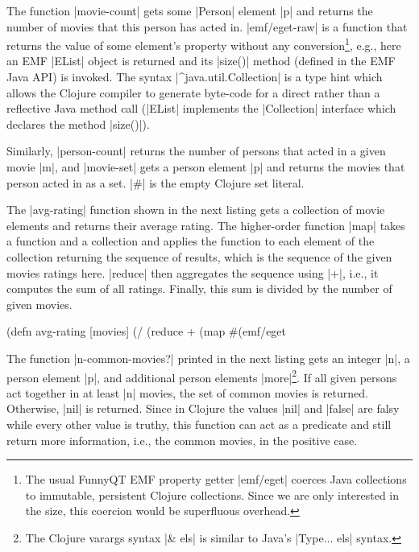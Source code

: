 \documentclass[submission]{eptcs}
\newcommand{\code}{\clojureinline}
\begin{document}
The function \code|movie-count| gets some \code|Person| element \code|p| and
returns the number of movies that this person has acted in.
\code|emf/eget-raw| is a function that returns the value of some element's
property without any conversion\footnote{The usual FunnyQT EMF property getter
  \code|emf/eget| coerces Java collections to immutable, persistent Clojure
  collections.  Since we are only interested in the size, this coercion would
  be superfluous overhead.}, e.g., here an EMF \code|EList| object is returned
and its \code|size()| method (defined in the EMF Java API) is invoked.  The
syntax \code|^java.util.Collection| is a type hint which allows the Clojure
compiler to generate byte-code for a direct rather than a reflective Java
method call (\code|EList| implements the \code|Collection| interface which
declares the method \code|size()|).

Similarly, \code|person-count| returns the number of persons that acted in a
given movie \code|m|, and \code|movie-set| gets a person element \code|p| and
returns the movies that person acted in as a set.  \code|#{}| is the empty
Clojure set literal.

The \code|avg-rating| function shown in the next listing gets a collection of
movie elements and returns their average rating.  The higher-order function
\code|map| takes a function and a collection and applies the function to each
element of the collection returning the sequence of results, which is the
sequence of the given movies ratings here.  \code|reduce| then aggregates the
sequence using \code|+|, i.e., it computes the sum of all ratings.  Finally,
this sum is divided by the number of given movies.

\begin{clojurecode}
(defn avg-rating [movies]
  (/ (reduce + (map #(emf/eget %
\end{clojurecode}

The function \code|n-common-movies?| printed in the next listing gets an
integer \code|n|, a person element \code|p|, and additional person elements
\code|more|\footnote{The Clojure varargs syntax \code|& els| is similar to
  Java's \code|Type... els| syntax.}.  If all given persons act together in at
least \code|n| movies, the set of common movies is returned.  Otherwise,
\code|nil| is returned.  Since in Clojure the values \code|nil| and
\code|false| are falsy while every other value is truthy, this function can act
as a predicate and still return more information, i.e., the common movies, in
the positive case.
\end{document}
